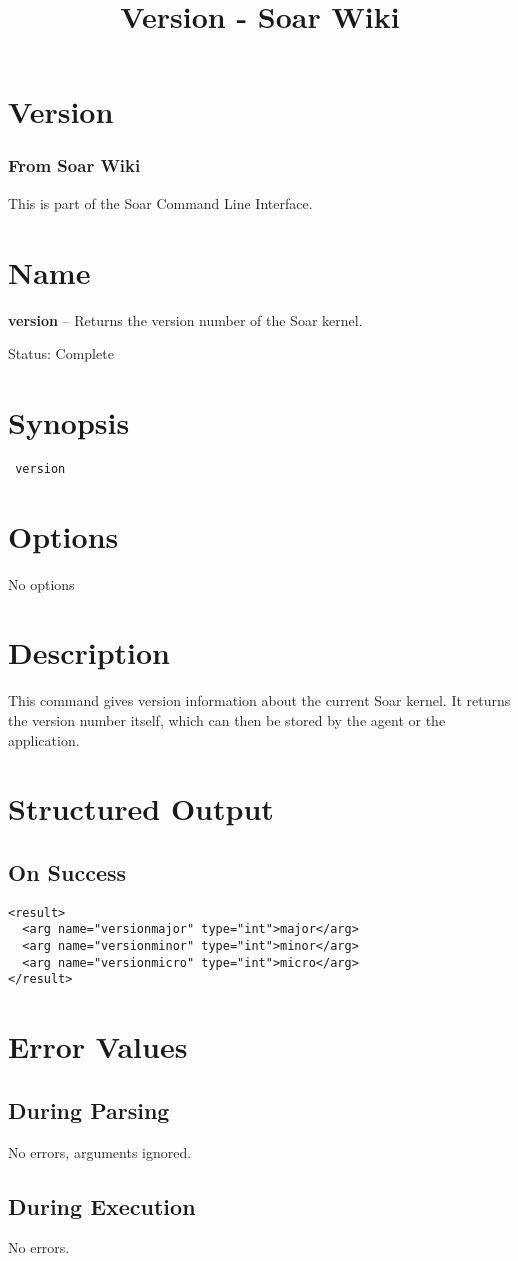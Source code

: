 \documentclass[10pt]{article}
\title{Version - Soar Wiki}
\begin{document}
\section*{Version}
\subsubsection*{From Soar Wiki}


 This is part of the Soar Command Line Interface. 
\section*{ Name }


 \textbf{version}
 -- Returns the version number of the Soar kernel. 


 Status: Complete
\section*{ Synopsis }
\begin{verbatim}
 version

\end{verbatim}
\section*{ Options }


 No options 
\section*{ Description }


 This command gives version information about the current Soar kernel. It returns the version number itself, which can then be stored by the agent or the application. 
\section*{ Structured Output }
\subsection*{ On Success }
\begin{verbatim}
<result>
  <arg name="versionmajor" type="int">major</arg>
  <arg name="versionminor" type="int">minor</arg>
  <arg name="versionmicro" type="int">micro</arg>
</result>

\end{verbatim}
\section*{ Error Values }
\subsection*{ During Parsing }


 No errors, arguments ignored. 
\subsection*{ During Execution }


 No errors. 
\end{document}

